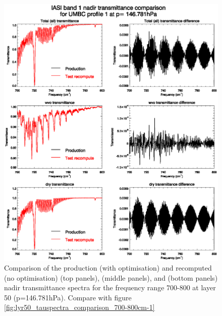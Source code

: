 \begin{figure}[htp]
  \centering
  \includegraphics[scale=0.8]{graphics/correct_lyr50_tauspectra_comparison_700-800cm-1.eps}
  \caption{Comparison of the production (with optimisation) and recomputed (no optimisation)  (top panels),  (middle panels), and  (bottom panels) nadir transmittance spectra for the frequency range 700-800\invcm{} at layer 50 (p=146.781hPa). Compare with figure \ref{fig:lyr50_tauspectra_comparison_700-800cm-1}}
  \label{fig:correct_lyr50_tauspectra_comparison_700-800cm-1}
\end{figure}
